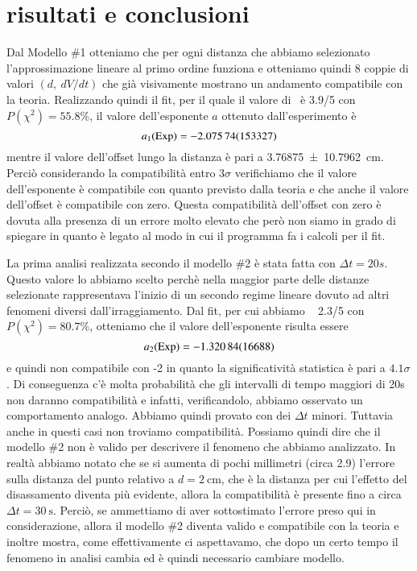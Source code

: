 \documentclass[
    rmp,
    reprint, 
    superscriptaddress, 
    altaffilletter, 
    amsmath, 
    amssymb,
    a4paper]{revtex4-2}
\begin{document}
\section*{risultati e conclusioni}
Dal Modello \#1 otteniamo che per ogni distanza che abbiamo selezionato l'approssimazione lineare al primo ordine funziona e otteniamo quindi 8 coppie di valori $(d,~dV/dt)$ che già visivamente mostrano un andamento compatibile con la teoria. Realizzando quindi il fit, per il quale il valore di \ChiNdf~è 3.9/5 con $P(\chi^2)=55.8\%$, il valore dell'esponente $a$ ottenuto dall'esperimento è \[a_1\text{(Exp)}=\num{-2.07574 +- 1.53327}\] mentre il valore dell'offset lungo la distanza è pari a \SI{3.76875 +- 10.7962}{\centi\metre}. Perciò considerando la compatibilità entro $3\sigma$ verifichiamo che il valore dell'esponente è compatibile con quanto previsto dalla teoria e che anche il valore dell'offset è compatibile con zero. Questa compatibilità dell'offset con zero è dovuta alla presenza di un errore molto elevato che però non siamo in grado di spiegare in quanto è legato al modo in cui il programma fa i calcoli per il fit.

La prima analisi realizzata secondo il modello \#2 è stata fatta con $\Delta t=20s$. Questo valore lo abbiamo scelto perchè nella maggior parte delle distanze selezionate rappresentava l'inizio di un secondo regime lineare dovuto ad altri fenomeni diversi dall'irraggiamento. Dal fit, per cui abbiamo \ChiNdf~ 2.3/5 con $P(\chi^2)=80.7\%$, otteniamo che il valore dell'esponente risulta essere \[a_2\text{(Exp)}=\num{-1.32084 +- 0.16688}\] e quindi non compatibile con -2 in quanto la significatività statistica è pari a $4.1\sigma$. Di conseguenza c'è molta probabilità che gli intervalli di tempo maggiori di 20s non daranno compatibilità e infatti, verificandolo, abbiamo osservato un comportamento analogo. Abbiamo quindi provato con dei $\Delta t$ minori. Tuttavia anche in questi casi non troviamo compatibilità. Possiamo quindi dire che il modello \#2 non è valido per descrivere il fenomeno che abbiamo analizzato. In realtà abbiamo notato che se si aumenta di pochi millimetri (circa \num{2.9}) l'errore sulla distanza del punto relativo a $d=\SI{2}{\centi\metre}$, che è la distanza per cui l'effetto del disassamento diventa più evidente, allora la compatibilità è presente fino a circa $\Delta t=\SI{30}{\second}$. Perciò, se ammettiamo di aver sottostimato l'errore preso qui in considerazione, allora il modello \#2 diventa valido e compatibile con la teoria e inoltre mostra, come effettivamente ci aspettavamo, che dopo un certo tempo il fenomeno in analisi cambia ed è quindi necessario cambiare modello.    
\end{document}
